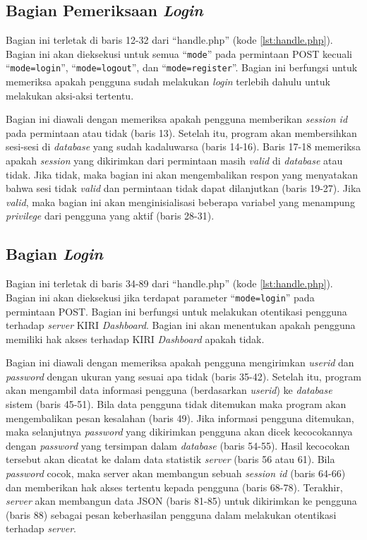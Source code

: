 \subsection{Bagian Pemeriksaan \textit{Login}}
\label{sec:pemeriksaanlogin}
Bagian ini terletak di baris 12-32 dari ``handle.php'' (kode \ref{lst:handle.php}). Bagian ini akan dieksekusi untuk semua ``\texttt{mode}'' pada permintaan POST kecuali ``\texttt{mode=login}'', ``\texttt{mode=logout}'', dan ``\texttt{mode=register}''. Bagian ini berfungsi untuk memeriksa apakah pengguna sudah melakukan \textit{login} terlebih dahulu untuk melakukan aksi-aksi tertentu.

Bagian ini diawali dengan memeriksa apakah pengguna memberikan \textit{session id} pada permintaan atau tidak (baris 13). Setelah itu, program akan membersihkan sesi-sesi di \textit{database} yang sudah kadaluwarsa (baris 14-16). Baris 17-18 memeriksa apakah \textit{session} yang dikirimkan dari permintaan masih \textit{valid} di \textit{database} atau tidak. Jika tidak, maka bagian ini akan mengembalikan respon yang menyatakan bahwa sesi tidak \textit{valid} dan permintaan tidak dapat dilanjutkan (baris 19-27). Jika \textit{valid}, maka bagian ini akan menginisialisasi beberapa variabel yang menampung \textit{privilege} dari pengguna yang aktif (baris 28-31).

\subsection{Bagian \textit{Login}}
\label{sec:bagianlogin}
Bagian ini terletak di baris 34-89 dari ``handle.php'' (kode \ref{lst:handle.php}). Bagian ini akan dieksekusi jika terdapat parameter ``\texttt{mode=login}'' pada permintaan POST. Bagian ini berfungsi untuk melakukan otentikasi pengguna terhadap \textit{server} KIRI \textit{Dashboard}. Bagian ini akan menentukan apakah pengguna memiliki hak akses terhadap KIRI \textit{Dashboard} apakah tidak.

Bagian ini diawali dengan memeriksa apakah pengguna mengirimkan \textit{userid} dan \textit{password} dengan ukuran yang sesuai apa tidak (baris 35-42). Setelah itu, program akan mengambil data informasi pengguna (berdasarkan \textit{userid}) ke \textit{database} sistem (baris 45-51). Bila data pengguna tidak ditemukan maka program akan mengembalikan pesan kesalahan (baris 49). Jika informasi pengguna ditemukan, maka selanjutnya \textit{password} yang dikirimkan pengguna akan dicek kecocokannya dengan \textit{password} yang tersimpan dalam \textit{database} (baris 54-55). Hasil kecocokan tersebut akan dicatat ke dalam data statistik \textit{server} (baris 56 atau 61). Bila \textit{password} cocok, maka server akan membangun sebuah \textit{session id} (baris 64-66) dan memberikan hak akses tertentu kepada pengguna (baris 68-78). Terakhir, \textit{server} akan membangun data JSON (baris 81-85) untuk dikirimkan ke pengguna (baris 88) sebagai pesan keberhasilan pengguna dalam melakukan otentikasi terhadap \textit{server}.

